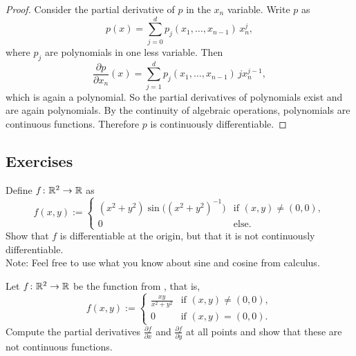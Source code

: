 \begin{proof}
Consider the partial derivative of $p$ in the $x_n$ variable.
Write $p$ as
\begin{equation*}
p(x) = \sum_{j=0}^d p_j(x_1,\ldots,x_{n-1}) \, x_n^j ,
\end{equation*}
where $p_j$ are polynomials in one less variable.
Then
\begin{equation*}
\frac{\partial p}{\partial x_n}(x)
= \sum_{j=1}^d p_j(x_1,\ldots,x_{n-1}) \, j x_n^{j-1} ,
\end{equation*}
which is again a polynomial.
So the partial derivatives of polynomials exist and are again polynomials.
By the continuity of algebraic operations, polynomials are continuous functions.
Therefore $p$ is continuously differentiable.
\end{proof}

\subsection{Exercises}

\begin{exercise}
Define $f \colon {\mathbb{R}}^2 \to {\mathbb{R}}$ as
\begin{equation*}
f(x,y) :=
\begin{cases}
(x^2+y^2)\sin\bigl({(x^2+y^2)}^{-1}\bigr) & \text{if } (x,y) \not= (0,0), \\
0                                         & \text{else.}
\end{cases}
\end{equation*}
Show that $f$ is differentiable at the origin, but that it is not 
continuously differentiable.
\\
Note: Feel free to use what you know about sine and cosine from calculus.
\end{exercise}

\begin{exercise}
Let $f \colon {\mathbb{R}}^2 \to {\mathbb{R}}$ be the function from
, that is,
\begin{equation*}
f(x,y)
:=
\begin{cases}
\frac{xy}{x^2+y^2} & \text{if } (x,y) \not= (0,0), \\
0                  & \text{if } (x,y) = (0,0).
\end{cases}
\end{equation*}
Compute the partial derivatives 
$\frac{\partial f}{\partial x}$ and
$\frac{\partial f}{\partial y}$ at all points and show that these are not
continuous functions.
\end{exercise}

